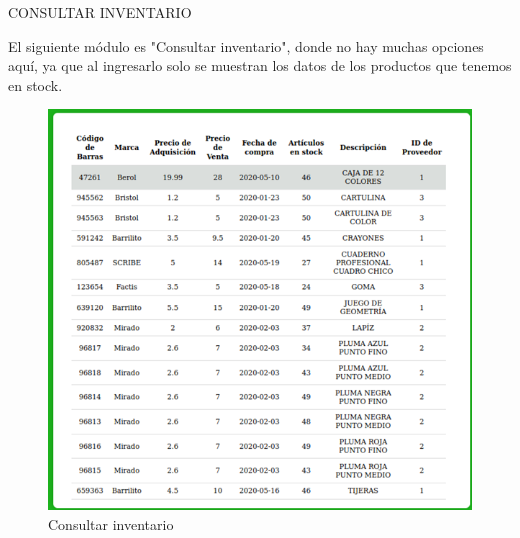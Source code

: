\documentclass{article}
\begin{document}
\pagebreak

\begin{center}
CONSULTAR INVENTARIO
\end{center}

El siguiente módulo es "Consultar inventario", donde no hay muchas opciones aquí, ya que al ingresarlo solo se muestran los datos de los productos que tenemos en stock.\\

\begin{figure}[h]
\caption {Consultar inventario}
\centering
\includegraphics[width=\textwidth]{fig8}
\end{figure}

\pagebreak
\end{document}
